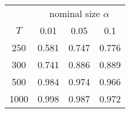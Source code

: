 % 
\begin{tabular}{cccc}
  \hline
  & \multicolumn{3}{c}{nominal size $\alpha$} \\
 $T$ & 0.01 & 0.05 & 0.1 \\
 \hline
250 & 0.581 & 0.747 & 0.776 \\ 
  300 & 0.741 & 0.886 & 0.889 \\ 
  500 & 0.984 & 0.974 & 0.966 \\ 
  1000 & 0.998 & 0.987 & 0.972 \\ 
   \hline
\end{tabular}
